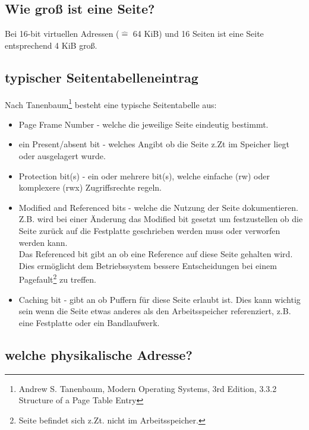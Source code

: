 \documentclass[ngerman]{fbi-aufgabenblatt}
\begin{document}

\subsection{Wie groß ist eine Seite?}

Bei 16-bit virtuellen Adressen ($\hat =$ 64 KiB) und 16 Seiten ist eine Seite entsprechend 4 KiB groß.

\subsection{typischer Seitentabelleneintrag}

Nach Tanenbaum\footnote{Andrew S. Tanenbaum, Modern Operating Systems, 3rd Edition, 3.3.2 Structure of a Page Table Entry}
besteht eine typische Seitentabelle aus:
\begin{itemize}
 \item Page Frame Number - welche die jeweilige Seite eindeutig bestimmt.
 \item ein Present/absent bit - welches Angibt ob die Seite z.Zt im Speicher liegt oder ausgelagert wurde.
 \item Protection bit(s) - ein oder mehrere bit(s), welche einfache (rw) oder komplexere (rwx) Zugriffsrechte regeln.
 \item Modified and Referenced bits - welche die Nutzung der Seite dokumentieren. Z.B. wird bei einer Änderung das
 Modified bit gesetzt um festzustellen ob die Seite zurück auf die Festplatte geschrieben werden muss oder verworfen werden kann.\\
 Das Referenced bit gibt an ob eine Reference auf diese Seite gehalten wird. Dies ermöglicht dem Betriebssystem bessere Entscheidungen
 bei einem Pagefault\footnote{Seite befindet sich z.Zt. nicht im Arbeitsspeicher.} zu treffen.
 \item Caching bit - gibt an ob Puffern für diese Seite erlaubt ist. Dies kann wichtig sein wenn die Seite etwas anderes als den
 Arbeitsspeicher referenziert, z.B. eine Festplatte oder ein Bandlaufwerk.
\end{itemize}


\subsection{welche physikalische Adresse?}
\end{document}
